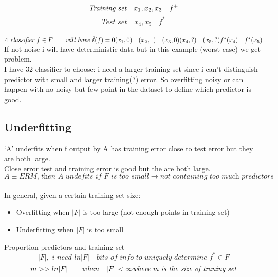 \documentclass[../main.tex]{subfiles}
\begin{document}
\\\\
\[
\textit{Training set} \quad {x_1,x_2,x_3} \quad f^+
\\
\]
\[
\textit{Test set} \quad {x_4,x_5} \quad f^* 
\]
\\
$
4 \textit{ classifier } f \in F \qquad \textit{will have } \hat{\ell}(f) = 0
\\\\
	(x_1,0) \quad (x_2,1) \quad (x_3,0) \\
	(x_4,?) \quad (x_5, ?) \\
	f^*(x_4) \quad f^*(x_5)
$
\\
If not noise i will have deterministic data but in this example (worst case) we
get problem.\\
I have 32 classifier to choose: i need a larger training set since i can’t
distinguish predictor with small and larger training(?) error.
So overfitting noisy or can happen with no noisy but few point in the dataset to
define which predictor is good.\\



\subsection{Underfitting}
‘A’ underfits when f output by A has training error close to test error but they
are both large.\\
Close error test and training error is good but the are both large.
\\
$$
A \equiv ERM  \textit{, then A undefits if F is too small} \rightarrow \textit{not containing too much predictors}
$$
\\
In general, given a certain training set size:
\begin{itemize}
\item Overfitting when $|F|$ is too large (not enough points in training set)
\item Underfitting when $|F|$ is too small
\end{itemize}
Proportion predictors and training set
\\
$$
|F|, \textit{ i need } ln |F| \quad \textit{bits of info to uniquely determine } f^* \in  F
$$
$$
m >> ln |F| \qquad when \quad |F| < \infty \textit{\\ where m is the size of traning set}
$$
\\
\end{document}
